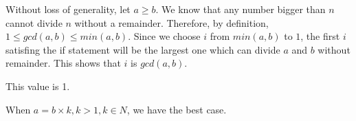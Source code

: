 \documentclass[11pt]{homework}
\begin{document}
  \begin{arabicpartsdsa}
    \item 

        Without loss of generality, let \(a \geq b\). We know that any number
        bigger than \(n\) cannot divide \(n\) without a remainder. Therefore, by
        definition, \(1 \leq gcd(a, b) \leq min(a, b)\). Since we choose \(i\)
        from \(min(a, b)\) to \(1\), the first \(i\) satisfing the if statement will be the
        largest one which can divide \(a\) and \(b\) without remainder. This shows that
        \(i\) is \(gcd(a, b)\).

    \item 

        This value is 1.

        When \(a = b \times k, k > 1, k \in N\), we have the best case.

  \end{arabicpartsdsa}

\pagebreak

\question
\end{document}

